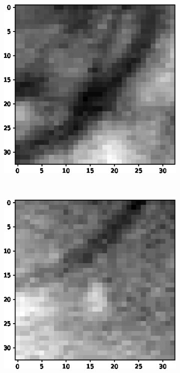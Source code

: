 \documentclass[aps,prb,10pt,twocolumn,groupedaddress]{revtex4-1}
\begin{document}
\begin{figure}[!t]
\begin{subfigure}[]{0.22\textwidth}
		\caption{}
	\end{subfigure}
	\hspace{1.55cm}
	\centering
	\begin{subfigure}[]{0.22\textwidth}
		\centering
		\includegraphics[width=\textwidth]{images/positive3.eps}
		\caption{}
	\end{subfigure}\\
	\vspace{0.25cm}
	\centering
	\begin{subfigure}[]{0.22\textwidth}
		\centering
		\includegraphics[width=\textwidth]{images/negative1.eps}

\end{subfigure}
\end{figure}
\end{document}
